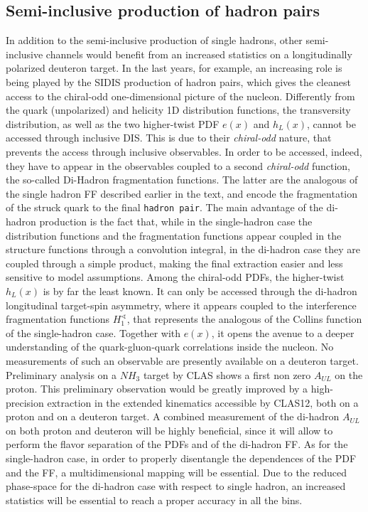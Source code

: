 \subsection{Semi-inclusive production of hadron pairs}
%
%
In addition to the semi-inclusive production of single hadrons, other semi-inclusive channels would benefit from an increased statistics on a longitudinally polarized deuteron target. 
In the last years, for example, an increasing role is being played by the SIDIS production of hadron pairs, which gives the cleanest access to the chiral-odd one-dimensional picture of the nucleon. Differently from the quark (unpolarized) and helicity 1D distribution functions, the transversity distribution, as well as the two higher-twist PDF $e(x)$ and $h_L(x)$, cannot be accessed through inclusive DIS. This is due to their \textit{chiral-odd} nature, that prevents the access through inclusive observables. In order to be accessed, indeed, they have to appear in the observables coupled to a second \textit{chiral-odd} function, the so-called Di-Hadron fragmentation functions. The latter are the analogous of the single hadron FF described earlier in the text, and encode the fragmentation of the struck quark to the final \texttt{hadron pair}. 
The main advantage of the di-hadron production is the fact that, while in the single-hadron case the distribution functions and the fragmentation functions appear coupled in the structure functions through a convolution integral, in the di-hadron case they are coupled through a simple product, making the final extraction easier and less sensitive to model assumptions. 
Among the chiral-odd PDFs, the higher-twist $h_L(x)$ is by far the least known. It can only be accessed through the di-hadron longitudinal target-spin asymmetry, where it appears coupled to the interference fragmentation functions $H_1^\sphericalangle$, that represents the analogous of the Collins function of the single-hadron case.
Together with $e(x)$, it opens the avenue to a deeper understanding of the quark-gluon-quark correlations inside the nucleon. No measurements of such an observable are presently available on a deuteron target. Preliminary analysis on a $NH_3$ target by CLAS shows a first non zero $A_{UL}$ on the proton. This preliminary observation would be greatly improved by a high-precision extraction in the extended kinematics accessible by CLAS12, both on a proton and on a deuteron target. A combined measurement of the di-hadron $A_{UL}$ on both proton and deuteron will be highly beneficial, since it will allow to perform the flavor separation of the PDFs and of the di-hadron FF. As for the single-hadron case, in order to properly disentangle the dependences of the PDF and the FF, a multidimensional mapping will be essential. Due to the reduced phase-space for the di-hadron case with respect to single hadron, an increased statistics will be essential to reach a proper accuracy in all the bins.
